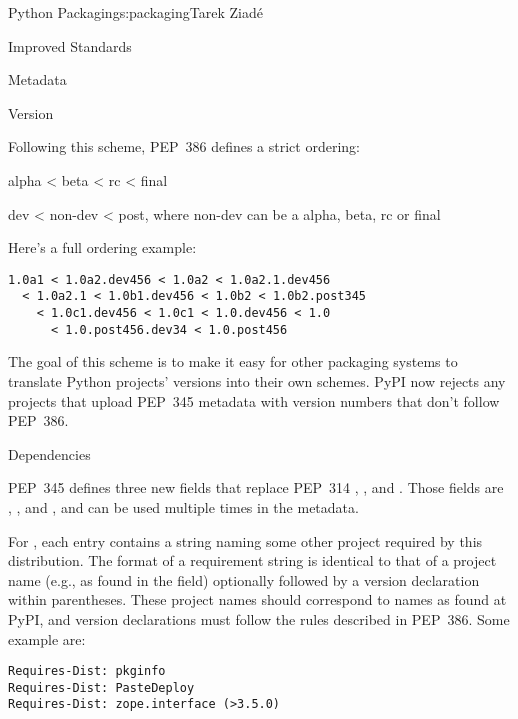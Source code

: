 \begin{aosachapter}{Python Packaging}{s:packaging}{Tarek Ziad\'{e}}
\begin{aosasect1}{Improved Standards}
\begin{aosasect2}{Metadata}
\begin{aosasect3}{Version}
\pagebreak

Following this scheme, PEP~386 defines a strict ordering:

\begin{aosaitemize}

  \item alpha {\textless} beta {\textless} rc {\textless} final

  \item dev {\textless} non-dev {\textless} post, where non-dev can be a alpha, beta,
  rc or final

\end{aosaitemize}

\noindent
Here's a full ordering example:

\begin{verbatim}
1.0a1 < 1.0a2.dev456 < 1.0a2 < 1.0a2.1.dev456
  < 1.0a2.1 < 1.0b1.dev456 < 1.0b2 < 1.0b2.post345
    < 1.0c1.dev456 < 1.0c1 < 1.0.dev456 < 1.0
      < 1.0.post456.dev34 < 1.0.post456
\end{verbatim}

\noindent
The goal of this scheme is to make it easy for other packaging systems
to translate Python projects' versions into their own schemes.  PyPI
now rejects any projects that upload PEP~345 metadata with version numbers
that don't follow PEP~386.

\end{aosasect3}

\begin{aosasect3}{Dependencies}

PEP~345 defines three new fields that replace PEP~314 ,
, and . Those fields are
, , and ,
and can be used multiple times in the metadata.

For , each entry contains a string naming some
other  project required by this distribution.  The
format of a requirement string is identical to that of a
 project name (e.g., as found in the  field)
optionally followed by a version declaration within parentheses.
These  project names should correspond to names as
found at PyPI, and version declarations must follow the rules
described in PEP~386. Some example are:

\begin{verbatim}
Requires-Dist: pkginfo
Requires-Dist: PasteDeploy
Requires-Dist: zope.interface (>3.5.0)
\end{verbatim}


\end{aosasect3}
\end{aosasect2}
\end{aosasect1}
\end{aosachapter}
